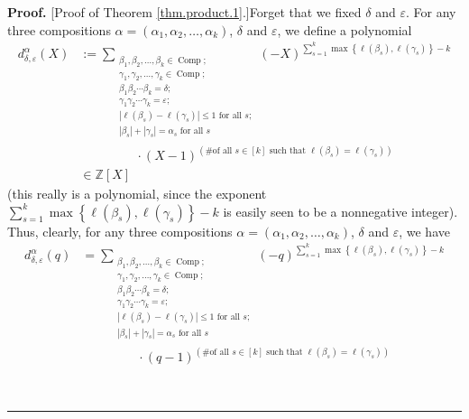 \documentclass[numbers=enddot,12pt,final,onecolumn,notitlepage]{scrartcl}%
\theoremstyle{definition}
\newenvironment{proof}[1][Proof]{\noindent\textbf{#1.} }{\ \rule{0.5em}{0.5em}}
\let\sumnonlimits\sum
\renewcommand{\sum}{\sumnonlimits\limits}
\begin{document}
\begin{proof}
[Proof of Theorem \ref{thm.product.1}.]Forget that we fixed $\delta$ and
$\varepsilon$. For any three compositions $\alpha=\left(  \alpha_{1}%
,\alpha_{2},\ldots,\alpha_{k}\right)  $, $\delta$ and $\varepsilon$, we define
a polynomial%
\begin{align}
d_{\delta,\varepsilon}^{\alpha}\left(  X\right)   &  :=\sum_{\substack{\beta
_{1},\beta_{2},\ldots,\beta_{k}\in\operatorname*{Comp};\\\gamma_{1},\gamma
_{2},\ldots,\gamma_{k}\in\operatorname*{Comp};\\\beta_{1}\beta_{2}\cdots
\beta_{k}=\delta;\\\gamma_{1}\gamma_{2}\cdots\gamma_{k}=\varepsilon
;\\\left\vert \ell\left(  \beta_{s}\right)  -\ell\left(  \gamma_{s}\right)
\right\vert \leq1\text{ for all }s;\\\left\vert \beta_{s}\right\vert
+\left\vert \gamma_{s}\right\vert =\alpha_{s}\text{ for all }s}}\left(
-X\right)  ^{\sum_{s=1}^{k}\max\left\{  \ell\left(  \beta_{s}\right)
,\ell\left(  \gamma_{s}\right)  \right\}  -k}\nonumber\\
&  \ \ \ \ \ \ \ \ \ \ \ \ \ \ \ \ \ \ \ \ \cdot\left(  X-1\right)  ^{\left(
\text{\# of all }s\in\left[  k\right]  \text{ such that }\ell\left(  \beta
_{s}\right)  =\ell\left(  \gamma_{s}\right)  \right)  }%
\label{pf.thm.product.1.dX=}\\
&  \in\mathbb{Z}\left[  X\right] \nonumber
\end{align}
(this really is a polynomial, since the exponent $\sum_{s=1}^{k}\max\left\{
\ell\left(  \beta_{s}\right)  ,\ell\left(  \gamma_{s}\right)  \right\}  -k$ is
easily seen to be a nonnegative integer). Thus, clearly, for any three
compositions $\alpha=\left(  \alpha_{1},\alpha_{2},\ldots,\alpha_{k}\right)
$, $\delta$ and $\varepsilon$, we have%
\begin{align}
d_{\delta,\varepsilon}^{\alpha}\left(  q\right)   &  =\sum_{\substack{\beta
_{1},\beta_{2},\ldots,\beta_{k}\in\operatorname*{Comp};\\\gamma_{1},\gamma
_{2},\ldots,\gamma_{k}\in\operatorname*{Comp};\\\beta_{1}\beta_{2}\cdots
\beta_{k}=\delta;\\\gamma_{1}\gamma_{2}\cdots\gamma_{k}=\varepsilon
;\\\left\vert \ell\left(  \beta_{s}\right)  -\ell\left(  \gamma_{s}\right)
\right\vert \leq1\text{ for all }s;\\\left\vert \beta_{s}\right\vert
+\left\vert \gamma_{s}\right\vert =\alpha_{s}\text{ for all }s}}\left(
-q\right)  ^{\sum_{s=1}^{k}\max\left\{  \ell\left(  \beta_{s}\right)
,\ell\left(  \gamma_{s}\right)  \right\}  -k}\nonumber\\
&  \ \ \ \ \ \ \ \ \ \ \ \ \ \ \ \ \ \ \ \ \cdot\left(  q-1\right)  ^{\left(
\text{\# of all }s\in\left[  k\right]  \text{ such that }\ell\left(  \beta
_{s}\right)  =\ell\left(  \gamma_{s}\right)  \right)  }
\label{pf.thm.product.1.dq=}%
\end{align}



\end{proof}
\end{document}
